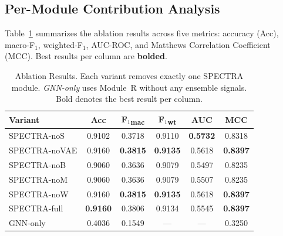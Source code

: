 \subsection{Per-Module Contribution Analysis}
\label{subsec:ablation_modules}

Table~\ref{tab:ablation} summarizes the ablation results across five metrics:
accuracy (Acc), macro-F$_1$, weighted-F$_1$, AUC-ROC, and Matthews
Correlation Coefficient (MCC).
Best results per column are \textbf{bolded}.

\begin{table}[t]
  \centering
  \renewcommand{\arraystretch}{1.15}
  \caption{Ablation Results. Each variant removes exactly one SPECTRA module.
           \textit{GNN-only} uses Module~R without any ensemble signals.
           Bold denotes the best result per column.}
  \label{tab:ablation}
  \begin{tabular}{@{}lccccc@{}}
    \toprule
    \textbf{Variant}
      & \textbf{Acc}
      & \textbf{F$_1$\textsubscript{mac}}
      & \textbf{F$_1$\textsubscript{wt}}
      & \textbf{AUC}
      & \textbf{MCC} \\
    \midrule
    SPECTRA-noS   & 0.9102 & 0.3718 & 0.9110 & \textbf{0.5732} & 0.8318 \\
    SPECTRA-noVAE & 0.9160 & \textbf{0.3815} & \textbf{0.9135} & 0.5618 & \textbf{0.8397} \\
    SPECTRA-noB   & 0.9060 & 0.3636 & 0.9079 & 0.5497 & 0.8235 \\
    SPECTRA-noM   & 0.9060 & 0.3636 & 0.9079 & 0.5507 & 0.8235 \\
    SPECTRA-noW   & 0.9160 & \textbf{0.3815} & \textbf{0.9135} & 0.5618 & \textbf{0.8397} \\
    \midrule
    SPECTRA-full  & \textbf{0.9160} & 0.3806 & 0.9134 & 0.5545 & \textbf{0.8397} \\
    \midrule[\heavyrulewidth]
    GNN-only      & 0.4036 & 0.1549 & --- & --- & 0.3250 \\
    \bottomrule
  \end{tabular}
\end{table}

